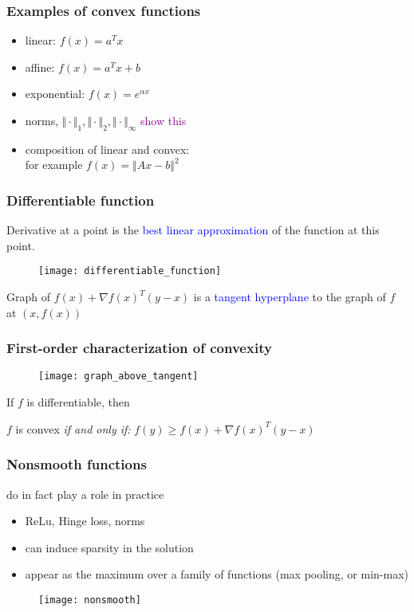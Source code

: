 \documentclass{beamer}
\begin{document}
\begin{frame}
  \frametitle{Examples of convex functions}
  \begin{itemize}
    \item linear: $f(x) = a^T x$
    \item affine: $f(x) = a^T x + b$
    \item exponential: $f(x) = e^{\alpha x}$
    \item norms, $\Vert \cdot \Vert_1, \Vert \cdot \Vert_2, \Vert \cdot \Vert_\infty$ \hfill \textcolor{purple}{show this}
    \item composition of linear and convex: \\
          for example $f(x)=\Vert Ax-b  \Vert^2$
  \end{itemize}

\end{frame}


\begin{frame}
  \frametitle{Differentiable function}
  Derivative at a point is the \textcolor{blue}{best linear approximation} of the function at this point.
  \begin{figure}[ht]
    \centering
    \texttt{[image: differentiable\_function]}
  \end{figure}
  \begin{center}
    Graph of $f(x)+ {\nabla f(x)}^T (y-x)$ is a \textcolor{blue}{tangent hyperplane} to the graph of $f$ at $(x,f(x))$
  \end{center}
\end{frame}


\begin{frame}
  \frametitle{First-order characterization of convexity}

  \begin{figure}[ht]
    \centering
    \texttt{[image: graph\_above\_tangent]}
  \end{figure}
  If $f$ is differentiable, then
  \begin{center}
    $f$ is convex \emph{if and only if:} $f(y) \ge f(x) + {\nabla f(x)}^T (y-x)$
  \end{center}
\end{frame}


\begin{frame}
  \frametitle{Nonsmooth functions }
  do in fact play a role in practice
  \begin{itemize}
    \item ReLu, Hinge loss, norms
    \item can induce sparsity in the solution
    \item appear as the maximum over a family of functions (max pooling, or min-max)
  \end{itemize}
  \begin{figure}[ht]
    \centering
    \texttt{[image: nonsmooth]}
  \end{figure}


\end{frame}
\end{document}
